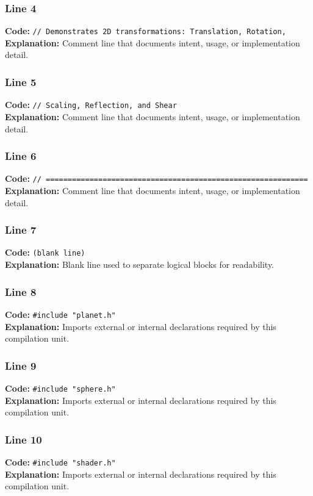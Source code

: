 \documentclass[11pt,a4paper]{article}
\begin{document}
\subsubsection*{Line 4}
\textbf{Code:} \verb|// Demonstrates 2D transformations: Translation, Rotation,|\\
\textbf{Explanation:} Comment line that documents intent, usage, or implementation detail.

\subsubsection*{Line 5}
\textbf{Code:} \verb|// Scaling, Reflection, and Shear|\\
\textbf{Explanation:} Comment line that documents intent, usage, or implementation detail.

\subsubsection*{Line 6}
\textbf{Code:} \verb|// ============================================================|\\
\textbf{Explanation:} Comment line that documents intent, usage, or implementation detail.

\subsubsection*{Line 7}
\textbf{Code:} \texttt{(blank line)}\\
\textbf{Explanation:} Blank line used to separate logical blocks for readability.

\subsubsection*{Line 8}
\textbf{Code:} \verb|#include "planet.h"|\\
\textbf{Explanation:} Imports external or internal declarations required by this compilation unit.

\subsubsection*{Line 9}
\textbf{Code:} \verb|#include "sphere.h"|\\
\textbf{Explanation:} Imports external or internal declarations required by this compilation unit.

\subsubsection*{Line 10}
\textbf{Code:} \verb|#include "shader.h"|\\
\textbf{Explanation:} Imports external or internal declarations required by this compilation unit.
\end{document}
